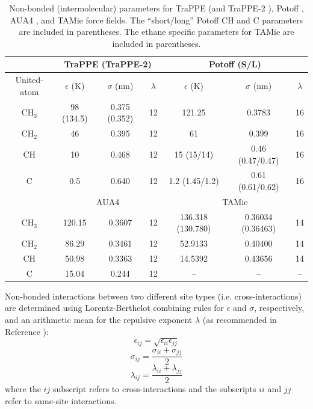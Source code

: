 \documentclass[preprint,review,12pt]{elsarticle}
\begin{document}
\begin{table}[h!]
	\caption{Non-bonded (intermolecular) parameters for TraPPE \cite{TraPPE,Martin1999} (and TraPPE-2 \cite{TraPPEUA2}), Potoff \cite{Mie,Potoff_branched}, AUA4 \cite{AUA4,Nieto2008}, and TAMie \cite{TAMie,Weidler2016} force fields. The ``short/long'' Potoff CH and C parameters are included in parentheses. 
		The ethane specific parameters for TAMie are included in parentheses.} \label{tab:nonbonded params}
	\begin{center}
		\begin{tabular}{|c|c|c|c|c|c|c|}
			\hline
			\multicolumn{1}{|c}{} & \multicolumn{3}{|c}{TraPPE  (TraPPE-2)} & \multicolumn{3}{|c|}{Potoff (S/L)}  \\ \hline
			United-atom & $\epsilon$ (K) & $\sigma$ (nm) & $\lambda$ & $\epsilon$ (K) & $\sigma$ (nm) & $\lambda$ \\ \hline
			CH$_3$ & 98 (134.5)  & 0.375 (0.352) & 12 & 121.25 & 0.3783 & 16  \\ 
			CH$_2$ & 46 & 0.395 & 12 & 61 & 0.399 & 16 \\ 
			CH & 10 & 0.468 & 12 & 15 (15/14) & 0.46 (0.47/0.47) & 16\\
			C & 0.5 & 0.640 & 12 & 1.2 (1.45/1.2) & 0.61 (0.61/0.62) & 16\\
			\hline
			\multicolumn{1}{|c}{} & \multicolumn{3}{|c}{AUA4} & \multicolumn{3}{|c|}{TAMie} \\ \hline
			CH$_3$ & 120.15  & 0.3607 & 12 & 136.318 (130.780) & 0.36034 (0.36463) & 14 \\ 
			CH$_2$ & 86.29 & 0.3461 & 12 & 52.9133 & 0.40400 & 14 \\ 
			CH & 50.98 & 0.3363 & 12 & 14.5392 & 0.43656 & 14\\
			C & 15.04 & 0.244 & 12 & -- & -- & --\\
			\hline
		\end{tabular}
	\end{center} 
\end{table}

Non-bonded interactions between two different site types (i.e. cross-interactions) are determined using Lorentz-Berthelot combining rules \cite{Allen1987} for $\epsilon$ and $\sigma$, respectively, and an arithmetic mean for the repulsive exponent $\lambda$ (as recommended in Reference ):
\begin{equation} \label{eq:Lorentz-Berthelot_eps}
\epsilon_{ij} = \sqrt{\epsilon_{ii} \epsilon_{jj}}
\end{equation}
\begin{equation} \label{eq:Lorentz-Berthelot_sig}
\sigma_{ij} = \frac{\sigma_{ii} + \sigma_{jj}}{2}
\end{equation}
\begin{equation} \label{eq:Lorentz-Berthelot_lam}
\lambda_{ij} = \frac{\lambda_{ii} + \lambda_{jj}}{2}
\end{equation}
where the $ij$ subscript refers to cross-interactions and the subscripts $ii$ and $jj$ refer to same-site interactions. 
\end{document}
